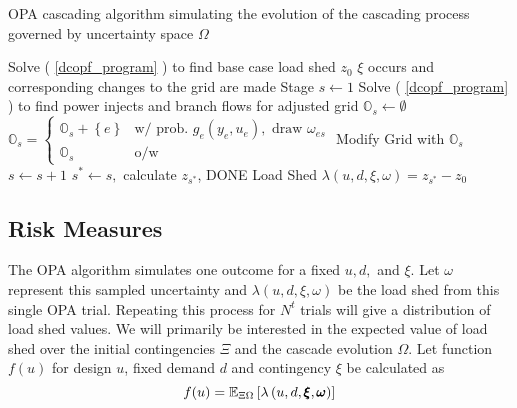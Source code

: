 \begin{algorithm}
\caption{OPA cascading algorithm simulating the evolution of the cascading process governed by uncertainty space $\Omega$}\label{opa_alg}
\begin{algorithmic}
\State Solve ( \ref{dcopf_program} ) to find base case load shed $z_0$
\State $\xi$ occurs and corresponding changes to the grid are made
\State Stage $s \gets 1$
\State Solve ( \ref{dcopf_program} ) to find power injects and branch flows for adjusted grid
\State $\mathbb{O}_s \gets \emptyset$
\State $\mathbb{O}_s = 
\left\{ 
\begin{array}{lr}
  \mathbb{O}_s + \left\{ e \right\} & \mbox{w/ prob. } g_e(y_e,u_e), \mbox{ draw } \omega_{es} \\
  \mathbb{O}_s & \mbox{o/w }
\end{array}
\right. $ 
\EndFor
{}
\State Modify Grid with $\mathbb{O}_s$
\State $s\gets s+1$
\Else
\State $s^* \gets s,$ calculate $z_{s^*}$, DONE
\EndIf
\EndWhile
\State \label{done}Load Shed $  \lambda\left(u,d,\xi,\omega\right)  = z_{s^*} - z_0$
\EndProcedure
\end{algorithmic}
\end{algorithm}

\subsection{Risk Measures}\label{riskmeasures}
The OPA algorithm simulates one outcome for a fixed $u, d,$ and $\xi$.  Let $\omega$ represent this sampled uncertainty and $\lambda\left(u,d,\xi,\omega\right)$ be the load shed from this single OPA trial.  Repeating this process for $N^t$ trials will give a distribution of load shed values.  We will primarily be interested in the expected value of load shed over the initial contingencies $\Xi$ and the cascade evolution $\Omega$.  Let function $f (u) $  for design $u$, fixed demand $d$ and contingency $\xi$ be calculated as 
\begin{equation}
f(u) = \mathbb{E}_{\Xi \Omega} \left[  \lambda\left(u,d,\pmb{\xi},\pmb{\omega}\right)  \right]
\end{equation}

